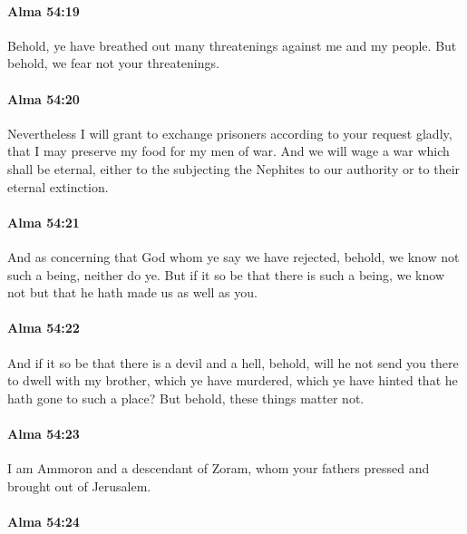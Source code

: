 		\paragraph{Alma 54:19} %
			\label{ALMA-54-19}

			Behold, ye have breathed out many threatenings against me and my people.
			But behold, we fear not your threatenings.

		\paragraph{Alma 54:20} %
			\label{ALMA-54-20}

			Nevertheless I will grant to exchange prisoners according to your request gladly,
			that I may preserve my food for my men of war.
			And we will wage a war which shall be eternal,
			either to the subjecting the Nephites to our authority
			or to their eternal extinction.

		\paragraph{Alma 54:21} %
			\label{ALMA-54-21}

			And as concerning that God whom ye say we have rejected,
			behold, we know not such a being, neither do ye.
			But if it so be that there is such a being,
			we know not but that he hath made us as well as you.

		\paragraph{Alma 54:22} %
			\label{ALMA-54-22}

			And if it so be that there is a devil and a hell,
			behold, will he not send you there
			to dwell with my brother, which ye have murdered,
			which ye have hinted that he hath gone to such a place?
			But behold, these things matter not.

		\paragraph{Alma 54:23} %
			\label{ALMA-54-23}

			I am Ammoron and a descendant of Zoram,
			whom your fathers pressed and brought out of Jerusalem.

		\paragraph{Alma 54:24} %
			\label{ALMA-54-24}

